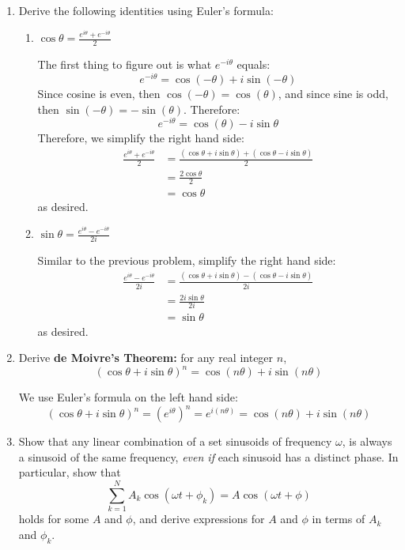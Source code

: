 \documentclass[10pt]{article}
\begin{document}
	\begin{enumerate}[label=\alph*)]
		\item Derive the following identities using Euler's formula:
			\begin{enumerate}[label=\roman*)]
				\item \( \cos \theta = \frac{e^{i\theta} + e^{-i \theta}}{2} \)

					\begin{solution}
						The first thing to figure out is what \( e^{-i \theta} \) equals:
						\[
						e^{-i \theta} = \cos(-\theta) + i \sin (-\theta)
						\] 
						Since cosine is even, then \( \cos(-\theta) = \cos(\theta) \), and since sine is odd, 
						then \( \sin(-\theta) = -\sin(\theta) \). Therefore:
						\[
						e^{-i \theta} = \cos(\theta) - i \sin \theta
						\] 
						Therefore, we simplify the right hand side:
						\begin{align*}
							\frac{e^{i \theta} + e^{-i \theta}}{2} &= \frac{(\cos \theta + i \sin \theta) + 
							(\cos \theta - i \sin \theta)}{2} \\
							&= \frac{2\cos \theta}{2} \\
							&= \cos \theta 
						\end{align*}
						as desired. 
					\end{solution}
				\item \( \sin \theta = \frac{e^{i \theta} - e^{-i \theta}}{2i} \)
					\begin{solution}
						Similar to the previous problem, simplify the right hand side:
						\begin{align*}
							\frac{e^{i \theta} - e^{- i \theta}}{2i} &= \frac{(\cos \theta + i \sin \theta) - 
							(\cos \theta - i \sin \theta)}{2i} \\
							&= \frac{2i \sin \theta}{2i} \\
							&= \sin \theta 
						\end{align*}
						as desired. 
					\end{solution}
			\end{enumerate}
		\item Derive \textbf{de Moivre's Theorem:} for any real integer \( n \), 
			\[
				(\cos \theta + i \sin \theta)^{n} = \cos(n \theta) + i \sin (n \theta)
			\] 
			\begin{solution}
				We use Euler's formula on the left hand side: 
				\[
					(\cos \theta + i \sin \theta)^{n} = (e^{i \theta})^{n} = e^{i (n \theta)} = \cos(n \theta) + i 
					\sin (n \theta)
				\] 
			\end{solution}
		\item Show that any linear combination of a set sinusoids of frequency \( \omega \), is always a sinusoid
			of the same frequency, \textit{even if} each sinusoid has a distinct phase. In particular, show
			that 
			\[
			\sum_{k = 1}^{N}A_k \cos(\omega t + \phi_k) = A \cos (\omega t + \phi)
			\] 
			holds for some \( A  \) and \( \phi \), and derive expressions for \( A \) and \( \phi \) in terms of 
			\( A_k \) and \( \phi_k \). 


\end{enumerate}
\end{document}
